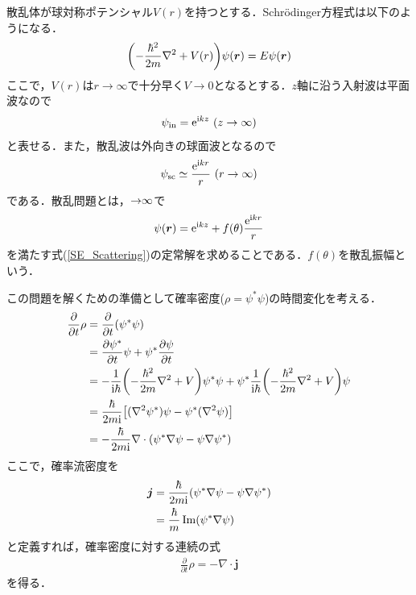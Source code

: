 \documentclass{report}
\begin{document}
  散乱体が球対称ポテンシャル$V(r)$を持つとする．Schrödinger方程式は以下のようになる．
  \begin{align}
    \label{SE_Scattering}
    \qty(-\frac{\hbar^2}{2m}\nabla^2 + V(r))\psi(\bm{r}) = E \psi(\bm{r})
  \end{align}
  ここで，$V(r)$は$r \to \infty$で十分早く$V \to 0$となるとする．$z$軸に沿う入射波は平面波なので
  \begin{align}
    \psi_{\mathrm{in}} = \mathrm{e}^{\mathrm{i} k z}\ (z \to \infty)
  \end{align}
  と表せる．また，散乱波は外向きの球面波となるので
  \begin{align}
    \psi_{\mathrm{sc}} \simeq \frac{\mathrm{e}^{\mathrm{i} kr}}{r}\ (r \to \infty)
  \end{align}
  である．散乱問題とは，$\mathrm{\to} \infty$で
  \begin{align}
    \psi(\bm{r}) = \mathrm{e}^{\mathrm{i} kz} + f(\theta) \frac{\mathrm{e}^{\mathrm{i} kr}}{r}
  \end{align}
  を満たす式(\ref{SE_Scattering})の定常解を求めることである．$f(\theta)$を散乱振幅という．

  この問題を解くための準備として確率密度($\rho = \psi^{*} \psi$)の時間変化を考える．
  \begin{align}
    \frac{\partial}{\partial t}\rho &= \frac{\partial}{\partial t}(\psi^{*}\psi)\\
    &= \frac{\partial \psi^{*}}{\partial t}\psi + \psi^{*}\frac{\partial \psi}{\partial t}\\
    &= -\frac{1}{\mathrm{i}\hbar}\qty(-\frac{\hbar^2}{2m}\nabla^2 + V)\psi^{*}\psi + \psi^{*}\frac{1}{\mathrm{i}\hbar}\qty(-\frac{\hbar^2}{2m}\nabla^2 + V)\psi\\
    &= \frac{\hbar}{2m\mathrm{i}}\qty[(\nabla^2 \psi^{*})\psi - \psi^{*}(\nabla^2\psi)]\\
    &= -\frac{\hbar}{2m\mathrm{i}}\nabla \cdot (\psi^{*}\nabla \psi - \psi \nabla \psi^{*})
  \end{align}
  ここで，確率流密度を
  \begin{align}
    \bm{j} &= \frac{\hbar}{2m\mathrm{i}} (\psi^{*}\nabla \psi - \psi \nabla \psi^{*})\\
    &= \frac{\hbar}{m}\Im (\psi^{*}\nabla\psi)
  \end{align}
  と定義すれば，確率密度に対する連続の式
  \begin{align}
    \frac{\partial}{\partial t} \rho = -\nabla \cdot \bm{j}
  \end{align}
  を得る．
\end{document}
